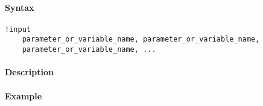


	\paragraph{Syntax}

\begin{verbatim}
!input
    parameter_or_variable_name, parameter_or_variable_name,
    parameter_or_variable_name, ...
\end{verbatim}

\paragraph{Description}

\paragraph{Example}


